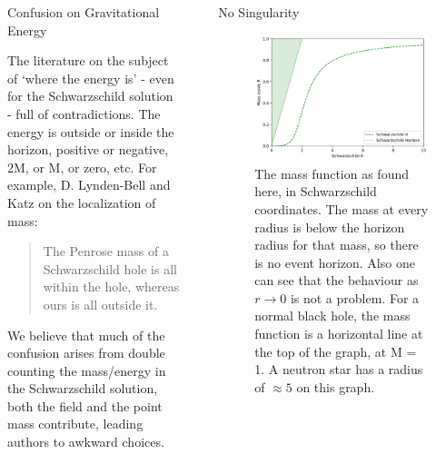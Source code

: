 \documentclass[final]{beamer}
\newlength{\sepwidth}
\newlength{\colwidth}
\newcommand{\separatorcolumn}{\begin{column}{\sepwidth}\end{column}}
\begin{document}
\begin{frame}[t]
\begin{columns}[t]
\begin{column}{\colwidth}
\begin{alertblock}{Confusion on Gravitational Energy}

The literature on the subject of `where the energy is' - even for the Schwarzschild solution - full of contradictions. The energy is outside or inside the horizon, positive or negative, 2M, or M, or zero, etc.  For example, D. Lynden-Bell and Katz on the localization of mass:\cite{lyndenbell1985}

\begin{quotation}
	The Penrose mass of a Schwarzschild hole is all within the hole, whereas ours is all outside it.
\end{quotation}

We believe that much of the confusion arises from double counting the mass/energy in the Schwarzschild solution, both the field and the point mass contribute, leading authors to awkward choices. 

\end{alertblock}


\end{column}

\separatorcolumn


\begin{column}{\colwidth}

  \begin{exampleblock}{No Singularity}

    \begin{figure}
\includegraphics[width=0.9\columnwidth]{no-horizons-s.png}
\caption{The mass function as found here, in Schwarzschild coordinates. The mass at every radius is below the horizon radius for that mass, so there is no event horizon. Also one can see that the behaviour as $r \rightarrow 0$ is not a problem. For a normal black hole, the mass function is a horizontal line at the top of the graph, at M = 1. A neutron star has a radius of $\approx 5$ on this graph.}
\label{isotropic-energy-hole-s}
\end{figure} 


\end{exampleblock}
\end{column}
\end{columns}
\end{frame}
\end{document}
